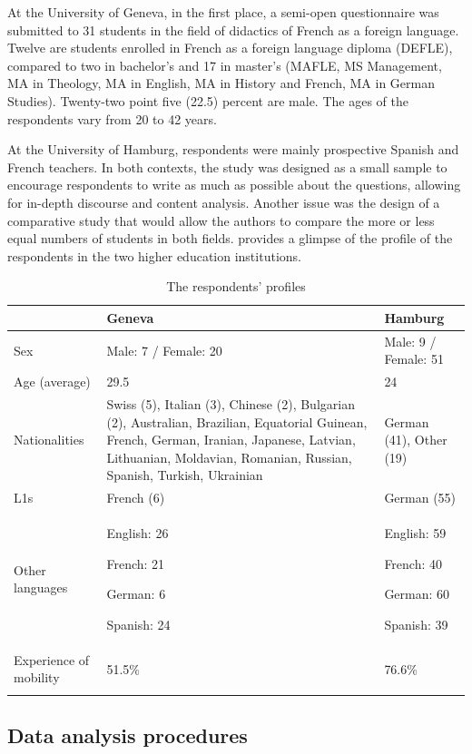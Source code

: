\documentclass[output=paper]{../langscibook}
\begin{document}
At the University of Geneva, in the first place, a semi-open questionnaire was submitted to 31 students in the field of didactics of French as a foreign language. Twelve are students enrolled in French as a foreign language diploma (DEFLE), compared to two in bachelor's and 17 in master's (MAFLE, MS Management, MA in Theology, MA in English, MA in History and French, MA in German Studies). Twenty-two point five (22.5) percent are male. The ages of the respondents vary from 20 to 42 years. 

At the University of Hamburg, respondents were mainly prospective Spanish and French teachers. In both contexts, the study was designed as a small sample to encourage respondents to write as much as possible about the questions, allowing for in-depth discourse and content analysis. Another issue was the design of a comparative study that would allow the authors to compare the more or less equal numbers of students in both fields.  provides a glimpse of the profile of the respondents in the two higher education institutions.

\begin{table}
\begin{tabularx}{\textwidth}{lQQ}
\lsptoprule
& Geneva & Hamburg\\
\midrule
Sex & Male: 7 / Female: 20 & Male: 9 / Female: 51\\
Age (average) & 29.5 & 24\\
Nationalities & Swiss (5), Italian (3), Chinese (2), Bulgarian (2), Australian, Brazilian, Equatorial Guinean, French, German, Iranian, Japanese, Latvian, Lithuanian, Moldavian, Romanian, Russian, Spanish, Turkish,  Ukrainian & German (41),
Other (19)\\
L1s & French (6) & German (55)\\
Other languages & English: 26

French: 21

German: 6

Spanish: 24 & English: 59

French: 40

German: 60

Spanish: 39\\
Experience of mobility & 51.5\% & 76.6\%\\
\lspbottomrule
\end{tabularx}
\caption{The respondents’ profiles}
\label{tab:9:2}
\end{table}


\subsection{Data analysis procedures}
\end{document}
